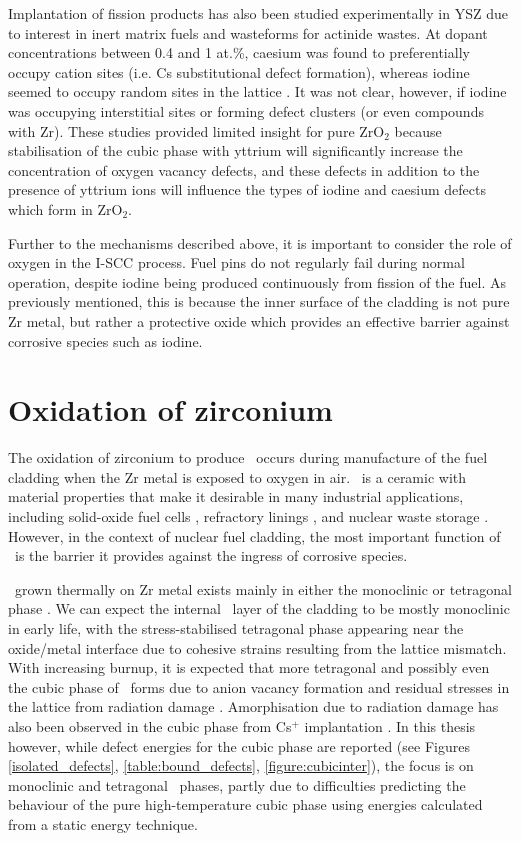 Implantation of fission products has also been studied experimentally in YSZ due to interest in inert matrix fuels and wasteforms for actinide wastes. At dopant concentrations between 0.4 and 1 at.\%, caesium was found to preferentially occupy cation sites (i.e. Cs substitutional defect formation), whereas iodine seemed to occupy random sites in the lattice \cite{Thome1999}. It was not clear, however, if iodine was occupying interstitial sites or forming defect clusters (or even compounds with Zr). These studies provided limited insight for pure ZrO$_{2}$ because stabilisation of the cubic phase with yttrium will significantly increase the concentration of oxygen vacancy defects, and these defects in addition to the presence of yttrium ions will influence the types of iodine and caesium defects which form in ZrO$_{2}$.

Further to the mechanisms described above, it is important to consider the role of oxygen in the I-SCC process. Fuel pins do not regularly fail during normal operation, despite iodine being produced continuously from fission of the fuel. As previously mentioned, this is because the inner surface of the cladding is not pure Zr metal, but rather a protective oxide which provides an effective barrier against corrosive species such as iodine.

\section{Oxidation of zirconium}

The oxidation of zirconium to produce \zirconia\ occurs during manufacture of the fuel cladding when the Zr metal is exposed to oxygen in air. \zirconia\ is a ceramic with material properties that make it desirable in many industrial applications, including solid-oxide fuel cells \cite{radford1979zirconia}, refractory linings \cite{whittemore1952fused}, and nuclear waste storage \cite{wang2012ceramics}. However, in the context of nuclear fuel cladding, the most important function of \zirconia\ is the barrier it provides against the ingress of corrosive species. 

\zirconia\ grown thermally on Zr metal exists mainly in either the monoclinic or tetragonal phase \cite{Howard1988,teufer1962crystal}. We can expect the internal \zirconia\ layer of the cladding to be mostly monoclinic in early life, with the stress-stabilised tetragonal phase appearing near the oxide/metal interface due to cohesive strains resulting from the lattice mismatch. With increasing burnup, it is expected that more tetragonal and possibly even the cubic phase of \zirconia\ forms due to anion vacancy formation and residual stresses in the lattice from radiation damage \cite{sickafus1999radiation}. Amorphisation due to radiation damage has also been observed in the cubic phase from Cs$^{+}$ implantation \cite{amorphization2000wang}. In this thesis however, while defect energies for the cubic phase are reported (see Figures \ref{isolated_defects}, \ref{table:bound_defects}, \ref{figure:cubicinter}), the focus is on monoclinic and tetragonal \zirconia\ phases, partly due to difficulties predicting the behaviour of the pure high-temperature cubic phase using energies calculated from a static energy technique. 

